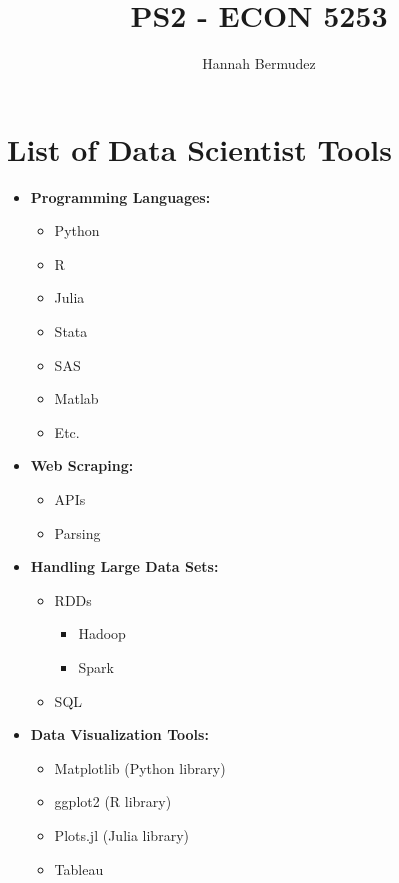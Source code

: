 \documentclass{article}
\title{PS2 - ECON 5253}
\author{Hannah Bermudez}
\begin{document}
\maketitle

\section{List of Data Scientist Tools}
\begin{itemize}
\item \textbf{Programming Languages:}
    \begin{itemize}
        \item Python
        \item R
        \item Julia
        \item Stata
        \item SAS
        \item Matlab
        \item Etc.
    \end{itemize}
    \item \textbf{Web Scraping:}
    \begin{itemize}
        \item APIs
        \item Parsing
    \end{itemize}
\item \textbf{Handling Large Data Sets:}
    \begin{itemize}
        \item RDDs
        \begin{itemize}
            \item Hadoop
            \item Spark
        \end{itemize}
        \item SQL
    \end{itemize}
\item \textbf{Data Visualization Tools:}
    \begin{itemize}
        \item Matplotlib (Python library)
        \item ggplot2 (R library)
        \item Plots.jl (Julia library)
        \item Tableau
    \end{itemize}
\end{itemize}
\end{document}

